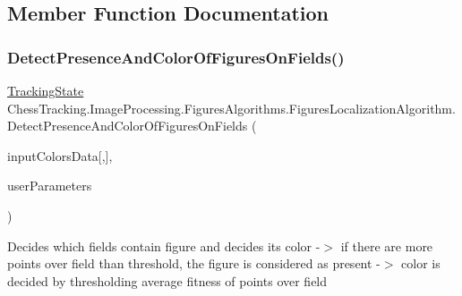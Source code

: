 \subsection{Member Function Documentation}
\mbox{\label{class_chess_tracking_1_1_image_processing_1_1_figures_algorithms_1_1_figures_localization_algorithm_a8e2bbbaa3cb473819582fbd20cdf3e89}} 
\subsubsection{\texorpdfstring{DetectPresenceAndColorOfFiguresOnFields()}{DetectPresenceAndColorOfFiguresOnFields()}}
{\footnotesize\ttfamily \mbox{\hyperlink{class_chess_tracking_1_1_multithreading_messages_1_1_tracking_state}{Tracking\+State}} Chess\+Tracking.\+Image\+Processing.\+Figures\+Algorithms.\+Figures\+Localization\+Algorithm.\+Detect\+Presence\+And\+Color\+Of\+Figures\+On\+Fields (\begin{DoxyParamCaption}\item[{List$<$ \mbox{\hyperlink{struct_chess_tracking_1_1_image_processing_1_1_pipeline_data_1_1_point2_d_with_color}{Point2\+D\+With\+Color}} $>$}]{input\+Colors\+Data\mbox{[},\mbox{]},  }\item[{\mbox{\hyperlink{class_chess_tracking_1_1_image_processing_1_1_pipeline_data_1_1_user_defined_parameters}{User\+Defined\+Parameters}}}]{user\+Parameters }\end{DoxyParamCaption})\hspace{0.3cm}{\ttfamily [private]}}



Decides which fields contain figure and decides its color -\/$>$ if there are more points over field than threshold, the figure is considered as present -\/$>$ color is decided by thresholding average fitness of points over field 


